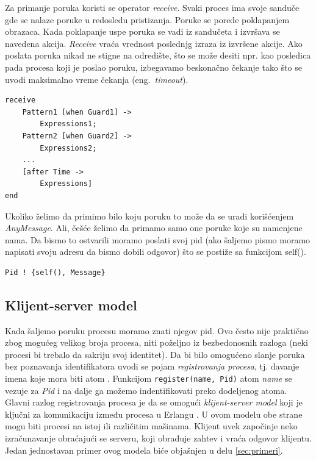 \documentclass[a4paper]{article}
\begin{document}
Za primanje poruka koristi se operator {\em receive}. 
Svaki proces ima svoje sanduče gde se nalaze poruke u redosledu pristizanja. 
Poruke se porede poklapanjem obrazaca. 
Kada poklapanje uspe poruka se vadi iz sandučeta i izvršava se navedena akcija. 
{\em Receive} vraća vrednost poslednjg izraza iz izvršene akcije.
Ako poslata poruka nikad ne stigne na odredište, 
što se može desiti npr. kao posledica pada procesa koji je poslao poruku, 
izbegavamo beskonačno čekanje tako što se uvodi maksimalno vreme čekanja (eng.~{\em timeout}).
\begin{verbatim}
receive
    Pattern1 [when Guard1] ->
        Expressions1;
    Pattern2 [when Guard2] ->
        Expressions2;
	... 
	[after Time -> 
		Expressions]
end
\end{verbatim}

Ukoliko želimo da primimo bilo koju poruku to može da se uradi korišćenjem {\em AnyMessage}. 
Ali, češće želimo da primamo samo one poruke koje su namenjene nama. 
Da bismo to ostvarili moramo poslati svoj pid 
(ako šaljemo pismo moramo napisati svoju adresu da bismo dobili odgovor) 
što se postiže sa funkcijom self().
\begin{verbatim}
Pid ! {self(), Message}
\end{verbatim}

\subsection{Klijent-server model}
\label{sec:ksmodel}
Kada šaljemo poruku procesu moramo znati njegov pid. 
Ovo često nije praktično zbog mogućeg velikog broja procesa, 
niti poželjno iz bezbedonosnih razloga 
(neki procesi bi trebalo da sakriju svoj identitet). 
Da bi bilo omogućeno slanje poruka bez poznavanja identifikatora uvodi se pojam {\em registrovanja procesa}, 
tj. davanje imena koje mora biti atom \cite{book_joe, phdthesis}.
Funkcijom {\texttt{register(name, Pid)}} atom {\em name} se vezuje za {\em Pid} i na dalje ga možemo indentifikovati preko dodeljenog atoma.\\

Glavni razlog registrovanja procesa je da se omogući {\em klijent-server model} koji je ključni za komunikaciju između procesa u Erlangu \cite{book_concurrent, book_joe, phdthesis}.
U ovom modelu obe strane mogu biti procesi na istoj ili različitim mašinama. 
Klijent uvek započinje neko izračunavanje obraćajući se serveru, 
koji obrađuje zahtev i vraća odgovor klijentu. Jedan jednostavan primer ovog modela biće objašnjen u delu \ref{sec:primeri}.
\end{document}
